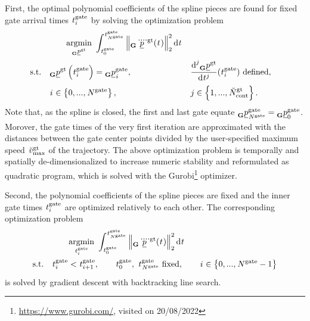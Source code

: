 \begin{itemize}
    First,
    the optimal polynomial coefficients of the spline pieces
    are found for fixed gate arrival times 
    $\timepnt[]{\gate}{i}{}{}$
    by solving the optimization problem
    \begin{align} \label{eq:glo_traj_opt_prob}
        &\qquad \argmin{\pos[]{\glotraj}{}{\grs}{}}
        \int_{\timepnt[]{\gate}{0}{}{}}^{\timepnt[]{\gate}{\num[]{\gate}{}{}{}}{}{}}
            \left\|
                \pos[\ddddot]{\glotraj}{}{\grs}{}(\timepnt[]{}{}{}{})
            \right\|^2_2
        \text d \timepnt[]{}{}{}{}
        \nonumber 
        \\
        \text{s.t.}\quad
        & \pos[]{\glotraj}{}{\grs}{}\left(\timepnt[]{\gate}{i}{}{}\right) = 
            \pos[]{\gate}{\idx[]{}{}{}{}}{\grs}{},
        &&
            \frac{\text d^j \pos[]{\glotraj}{}{\grs}{}}{\text d \timepnt[]{j}{}{}{}} 
            (\timepnt[]{\gate}{i}{}{}) \text{ defined},
        \nonumber \\
        & \idx[]{}{}{}{} \in \left\{0, ..., \num[]{\gate}{}{}{}\right\},
        && j \in \left\{1, ..., \num[\user]{\glotraj}{\text{cont}}{}{}\right\}.
    \end{align}
    Note that, as the spline is closed, 
    the first and last gate equate 
    $\pos[]{\gate}{\num[]{\gate}{}{}{}}{\grs}{} = \pos[]{\gate}{0}{\grs}{}$.
    Morover, the gate times of the very first iteration are 
    approximated with the distances between the gate center points
    divided by the user-specified maximum speed $\speed[\user]{\glotraj}{\mxm}{}{}$ of the trajectory.
    The above optimization problem
    is temporally and spatially de-dimensionalized 
    to increase numeric stability and 
    reformulated as quadratic program,
    which is solved with the Gurobi\footnote{
        \url{https://www.gurobi.com/}, visited on 20/08/2022
    } optimizer.

    Second, the polynomial coefficients of the spline pieces 
    are fixed
    and the inner gate times
    $\timepnt[]{\gate}{i}{}{}$
    are optimized relatively to each other.
    The corresponding optimization problem
    \begin{align}
        &\qquad \argmin{\timepnt[]{\gate}{i}{}{}}
        \int_{\timepnt[]{\gate}{0}{}{}}^{\timepnt[]{\gate}{\num[]{\gate}{}{}{}}{}{}}
            \left\|
                \pos[\ddddot]{\glotraj}{}{\grs}{}(\timepnt[]{}{}{}{})
            \right\|^2_2
        \text d \timepnt[]{}{}{}{}
        \nonumber \\
        \text{s.t.}\quad
        & \timepnt[]{\gate}{i}{}{} < \timepnt[]{\gate}{i+1}{}{},
        \qquad
        \timepnt[]{\gate}{0}{}{},\ \timepnt[]{\gate}{\num[]{\gate}{}{}{}}{}{} \text{ fixed},
        \qquad
        \idx[]{}{}{}{} \in \left\{0, ..., \num[]{\gate}{}{}{} - 1 \right\}
    \end{align}
    is solved by gradient descent with backtracking line search.


\end{itemize}
